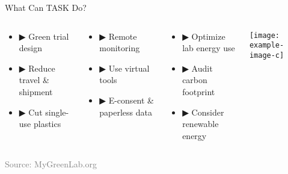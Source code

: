 \documentclass{beamer}
\newcommand{\source}[1]{\vspace{0.3cm}\hfill\scriptsize\textcolor{gray}{Source: #1}}
\begin{document}
\begin{frame}{What Can TASK Do?}
\begin{columns}
\begin{tcolorbox}[colback=taskgreen!10, colframe=taskgreen, title=\textbf{Trial Design \& Operations}]
\begin{itemize}[leftmargin=*]
    \item \textcolor{taskgreen}{▶} Green trial design
    \item \textcolor{taskgreen}{▶} Reduce travel \& shipment
    \item \textcolor{taskgreen}{▶} Cut single-use plastics
\end{itemize}
\end{tcolorbox}

\vspace{0.3cm}
\begin{tcolorbox}[colback=taskblue!10, colframe=taskblue, title=\textbf{Digital Solutions}]
\begin{itemize}[leftmargin=*]
    \item \textcolor{taskblue}{▶} Remote monitoring
    \item \textcolor{taskblue}{▶} Use virtual tools
    \item \textcolor{taskblue}{▶} E-consent \& paperless data
\end{itemize}
\end{tcolorbox}

\begin{tcolorbox}[colback=taskorange!10, colframe=taskorange, title=\textbf{Lab \& Energy}]
\begin{itemize}[leftmargin=*]
    \item \textcolor{taskorange}{▶} Optimize lab energy use
    \item \textcolor{taskorange}{▶} Audit carbon footprint
    \item \textcolor{taskorange}{▶} Consider renewable energy
\end{itemize}
\end{tcolorbox}

\vspace{0.3cm}
\texttt{[image: example-image-c]} %
\end{columns}

\source{MyGreenLab.org}
\end{frame}
\end{document}
